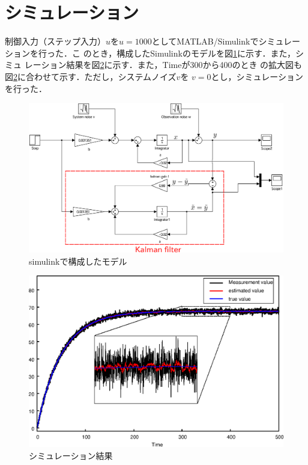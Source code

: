 \documentclass[a4paper,12pt]{jarticle}
\begin{document}
\section{シミュレーション}
制御入力（ステップ入力）$u$を$u=1000$としてMATLAB/Simulinkでシミュレーションを行った．こ
のとき，構成したSimulinkのモデルを図\ref{fig:kalman_b}に示す．また，シミュ
レーション結果を図\ref{fig:kalman_g}に示す．また，Timeが300から400のとき
の拡大図も図\ref{fig:kalman_g}に合わせて示す．ただし，システムノイズ$v$を
$v=0$とし，シミュレーションを行った．
%
\begin{figure}[bp]
 \begin{center}
  \includegraphics[width = 150mm]{fig/kalmanfilter2.eps}
 \end{center}
 \caption{simulinkで構成したモデル}
 \label{fig:kalman_b}
\end{figure}
%
\begin{figure}[htbp]
 \begin{center}
  \includegraphics[width = 170mm]{fig/kalmanfilterG2.eps}
 \end{center}
 \caption{シミュレーション結果}
 \label{fig:kalman_g}
\end{figure}
%
\newpage
\end{document}

